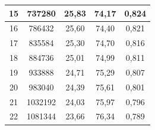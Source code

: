 \begin{table}[]
{\begin{tabular}{ccccc}
			15                & 737280                                                                 & 25,83                                                                        & 74,17                                                                             & 0,824                   \\ \hline
			16                & 786432                                                                 & 25,60                                                                        & 74,40                                                                             & 0,821                   \\ \hline
			17                & 835584                                                                 & 25,30                                                                        & 74,70                                                                             & 0,816                   \\ \hline
			18                & 884736                                                                 & 25,01                                                                        & 74,99                                                                             & 0,811                   \\ \hline
			19                & 933888                                                                 & 24,71                                                                        & 75,29                                                                             & 0,807                   \\ \hline
			20                & 983040                                                                 & 24,39                                                                        & 75,61                                                                             & 0,801                   \\ \hline
			21                & 1032192                                                                & 24,03                                                                        & 75,97                                                                             & 0,796                   \\ \hline
			22                & 1081344                                                                & 23,66                                                                        & 76,34                                                                             & 0,789                   \\ \hline
	\end{tabular}} \quad
	\label{table:entrop}
\end{table}





